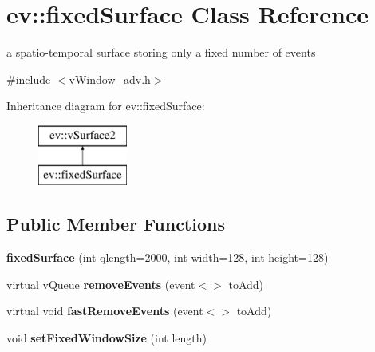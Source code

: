 \hypertarget{classev_1_1fixedSurface}{}\section{ev\+:\+:fixed\+Surface Class Reference}
\label{classev_1_1fixedSurface}


a spatio-\/temporal surface storing only a fixed number of events  




{\ttfamily \#include $<$v\+Window\+\_\+adv.\+h$>$}

Inheritance diagram for ev\+:\+:fixed\+Surface\+:\begin{figure}[H]
\begin{center}
\leavevmode
\includegraphics[height=2.000000cm]{classev_1_1fixedSurface}
\end{center}
\end{figure}
\subsection*{Public Member Functions}
\begin{DoxyCompactItemize}
\item 
{\bfseries fixed\+Surface} (int qlength=2000, int \hyperlink{classev_1_1vSurface2_a1aa8027816352a15d5b9bf1f26f48e76}{width}=128, int height=128)\hypertarget{classev_1_1fixedSurface_adee898e7c65c9c8d41fd20530d9f10b0}{}\label{classev_1_1fixedSurface_adee898e7c65c9c8d41fd20530d9f10b0}

\item 
virtual v\+Queue {\bfseries remove\+Events} (event$<$$>$ to\+Add)\hypertarget{classev_1_1fixedSurface_ace012acf57456f71d77fc7a349a915d7}{}\label{classev_1_1fixedSurface_ace012acf57456f71d77fc7a349a915d7}

\item 
virtual void {\bfseries fast\+Remove\+Events} (event$<$$>$ to\+Add)\hypertarget{classev_1_1fixedSurface_a317c375340f308fda67c6da2074f0e0e}{}\label{classev_1_1fixedSurface_a317c375340f308fda67c6da2074f0e0e}

\item 
void {\bfseries set\+Fixed\+Window\+Size} (int length)\hypertarget{classev_1_1fixedSurface_ac8249b63b5ada0491d6a6ff70b745488}{}\label{classev_1_1fixedSurface_ac8249b63b5ada0491d6a6ff70b745488}

\end{DoxyCompactItemize}
